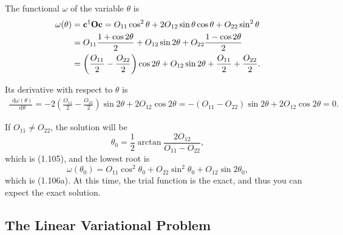 \documentclass[a4paper]{book}
\newcounter{solution}[chapter]
\newcommand*{\dif}{\mathop{}\!\mathrm{d}}
\newcommand{\Op}{{\bf O}}
\begin{document}
	\begin{solution}
	
	The functional $\omega$ of the variable $\theta$ is
	\begin{align*}
		\omega(\theta) &= {\bf c}^\dagger \Op {\bf c} = O_{11} \cos^2 \theta + 2O_{12} \sin \theta \cos \theta + O_{22} \sin^2 \theta \\
		&= O_{11} \frac{ 1 + \cos 2\theta }{2} + O_{12} \sin 2 \theta + O_{22} \frac{ 1 - \cos 2\theta }{2} \\
		&= \left( \frac{O_{11}}{2} - \frac{ O_{22} }{2} \right) \cos 2 \theta + O_{12} \sin 2 \theta + \frac{O_{11}}{2} + \frac{ O_{22} }{2} . 
	\end{align*}
	
	Its derivative with respect to $\theta$ is
	\begin{align*}
		\frac{\dif \omega(\theta) }{\dif \theta} = -2 \left( \frac{O_{11}}{2} - \frac{ O_{22} }{2} \right) \sin 2 \theta + 2 O_{12} \cos 2\theta = - ( O_{11} - O_{22} ) \sin 2 \theta + 2 O_{12} \cos 2\theta = 0.
	\end{align*}	
	
	If $O_{11} \neq O_{22}$, the solution will be
	\[
		\theta_0 = \frac{1}{2} \arctan{ \frac{ 2O_{12} }{ O_{11} - O_{22} } } ,
	\]
	which is (1.105), and the lowest root is
	\[
		\omega(\theta_0) = O_{11} \cos^2 \theta_0 + O_{22} \sin^2 \theta_0 + O_{12} \sin 2\theta_0 ,
	\]
	which is (1.106a). At this time, the trial function is the exact, and thus you can expect the exact solution.
	
	\end{solution}
	
	\subsection{The Linear Variational Problem}
	
\end{document}
